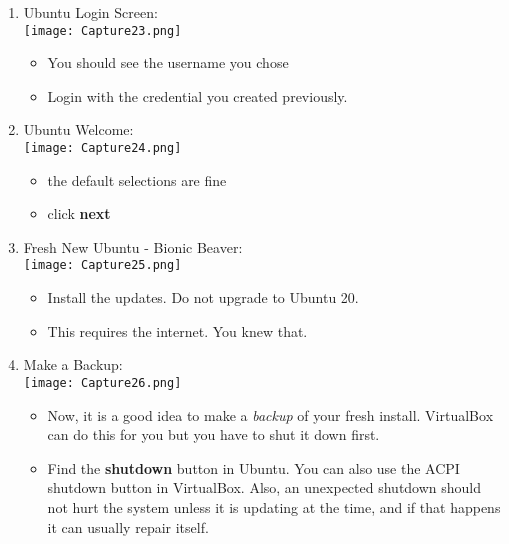 \documentclass[12pt]{article}
\begin{document}
\begin{description}
\begin{description}
\begin{enumerate}[label=\alph*)]
    	\newpage
    		\item Ubuntu Login Screen: \vspace{5mm} \\
      		\texttt{[image: Capture23.png]}
      		 \begin{itemize}
        	\item You should see the username you chose 
        	\item Login with the credential you created previously.
    		\end{itemize} 
    		 \vspace{5mm} 
    		\item Ubuntu Welcome: \vspace{5mm} \\
      		\texttt{[image: Capture24.png]}
      		 \begin{itemize}      	
     		\item the default selections are fine
     		\item click {\bf next}
    		\end{itemize}
    		
    		\newpage
    		\item Fresh New Ubuntu - Bionic Beaver: \vspace{5mm} \\
      		\texttt{[image: Capture25.png]}
      		 \begin{itemize}
        	\item Install the updates. Do not upgrade to Ubuntu 20.
        	\item This requires the internet. You knew that. 
    		\end{itemize} 
    		 \vspace{5mm} 
    		\item Make a Backup: \vspace{5mm} \\
      		\texttt{[image: Capture26.png]}
      		 \begin{itemize}
      		\item Now, it is a good idea to make a {\it backup} of your fresh install. VirtualBox can do this for you but you have to shut it down first.  
         
     		\item Find the {\bf shutdown} button in Ubuntu. You can also use the ACPI shutdown button in VirtualBox. Also, an unexpected shutdown should not hurt the system unless it is updating at the time, and if that happens it can usually repair itself. 
    		\end{itemize}
    		

\end{enumerate}
\end{description}
\end{description}
\end{document}
